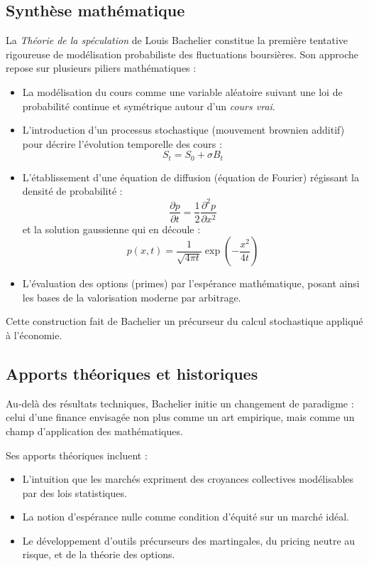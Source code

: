 \documentclass[12pt,a4paper]{article}
\begin{document}
\subsection{Synthèse mathématique}

La \textit{Théorie de la spéculation} de Louis Bachelier constitue la première tentative rigoureuse de modélisation probabiliste des fluctuations boursières. Son approche repose sur plusieurs piliers mathématiques :

\begin{itemize}
    \item La modélisation du cours comme une variable aléatoire suivant une loi de probabilité continue et symétrique autour d’un \textit{cours vrai}.
    
    \item L’introduction d’un processus stochastique (mouvement brownien additif) pour décrire l’évolution temporelle des cours :
    \[
    S_t = S_0 + \sigma B_t
    \]

    \item L’établissement d’une équation de diffusion (équation de Fourier) régissant la densité de probabilité :
    \[
    \frac{\partial p}{\partial t} = \frac{1}{2} \frac{\partial^2 p}{\partial x^2}
    \]
    et la solution gaussienne qui en découle :
    \[
    p(x,t) = \frac{1}{\sqrt{4\pi t}} \exp\left(-\frac{x^2}{4t}\right)
    \]

    \item L’évaluation des options (primes) par l’espérance mathématique, posant ainsi les bases de la valorisation moderne par arbitrage.
\end{itemize}

Cette construction fait de Bachelier un précurseur du calcul stochastique appliqué à l'économie.

\subsection{Apports théoriques et historiques}

Au-delà des résultats techniques, Bachelier initie un changement de paradigme : celui d’une finance envisagée non plus comme un art empirique, mais comme un champ d’application des mathématiques.

Ses apports théoriques incluent :
\begin{itemize}
    \item L’intuition que les marchés expriment des croyances collectives modélisables par des lois statistiques.
    \item La notion d’espérance nulle comme condition d’équité sur un marché idéal.
    \item Le développement d’outils précurseurs des martingales, du pricing neutre au risque, et de la théorie des options.
\end{itemize}
\end{document}

